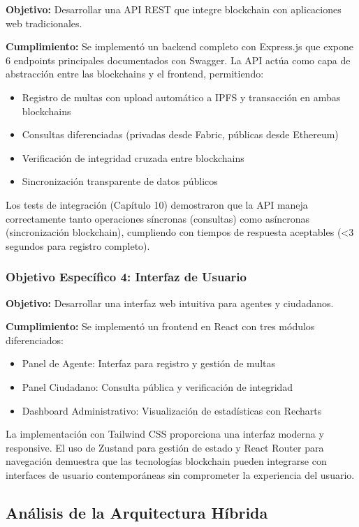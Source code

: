 \textbf{Objetivo:} Desarrollar una API REST que integre blockchain con aplicaciones web tradicionales.

\textbf{Cumplimiento:} Se implementó un backend completo con Express.js que expone 6 endpoints principales documentados con Swagger. La API actúa como capa de abstracción entre las blockchains y el frontend, permitiendo:
\begin{itemize}
    \item Registro de multas con upload automático a IPFS y transacción en ambas blockchains
    \item Consultas diferenciadas (privadas desde Fabric, públicas desde Ethereum)
    \item Verificación de integridad cruzada entre blockchains
    \item Sincronización transparente de datos públicos
\end{itemize}

Los tests de integración (Capítulo 10) demostraron que la API maneja correctamente tanto operaciones síncronas (consultas) como asíncronas (sincronización blockchain), cumpliendo con tiempos de respuesta aceptables (<3 segundos para registro completo).

\subsubsection{Objetivo Específico 4: Interfaz de Usuario}

\textbf{Objetivo:} Desarrollar una interfaz web intuitiva para agentes y ciudadanos.

\textbf{Cumplimiento:} Se implementó un frontend en React con tres módulos diferenciados:
\begin{itemize}
    \item Panel de Agente: Interfaz para registro y gestión de multas
    \item Panel Ciudadano: Consulta pública y verificación de integridad
    \item Dashboard Administrativo: Visualización de estadísticas con Recharts
\end{itemize}

La implementación con Tailwind CSS proporciona una interfaz moderna y responsive. El uso de Zustand para gestión de estado y React Router para navegación demuestra que las tecnologías blockchain pueden integrarse con interfaces de usuario contemporáneas sin comprometer la experiencia del usuario.

\subsection{Análisis de la Arquitectura Híbrida}

